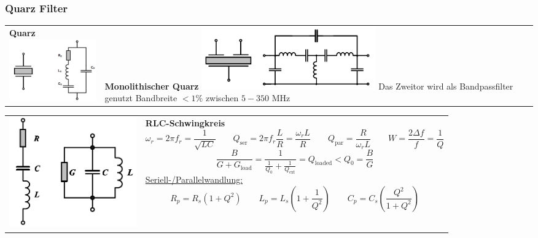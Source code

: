 \subsubsection{Quarz Filter }

\begin{tabular}{ll} 
\parbox{9cm}{
	\textbf{Quarz} \\ 
	\includegraphics[width=5cm]{./bilder/components_filter_quarz.png}	
	 } & \parbox{9cm}{  
	\textbf{Monolithischer Quarz} \\
	\includegraphics[width=7.5cm]{./bilder/components_filter_quarz-monolithic.png}\\
	Das Zweitor wird als Bandpassfilter genutzt \\
	Bandbreite $< 1\%$  zwischen $5 - 350$ MHz	
	}
\end{tabular}

\begin{tabular}{ll} 
\parbox{5.5cm}{
	\includegraphics[width=5.5cm]{./bilder/components_filter_rlc-resonator.png}	
	 } & \parbox{12cm}{ 
	\textbf{RLC-Schwingkreis}\\
		$$\omega_r=2\pi f_r=\dfrac 1{\sqrt{LC}} \qquad
		Q_{\text{ser}} =2\pi f_r \dfrac LR = \dfrac{\omega_r L}R \qquad
		Q_{\text{par}} = \dfrac R{\omega_r L} \qquad 
		W=\frac{2\Delta f}f= \frac 1Q $$ 
		$$\frac B{G+G_{\text{load}}} = \dfrac{1}{\frac 1{Q_0}+ \frac
		1{Q_{\text{ext}}}} = Q_{\text{loaded}} < Q_0 = \dfrac BG$$
		\underline{Seriell-/Parallelwandlung:}
		$$   R_p = R_s (1+Q^2) \qquad 
  L_p = L_s (1+\frac 1{Q^2}) \qquad 
  C_p = C_s (\frac{Q^2}{1+Q^2})$$ 
		
		 }
\end{tabular}

